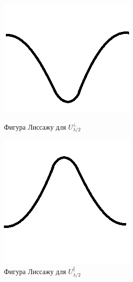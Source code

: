 \documentclass[a4paper, 12pt]{article}%
\begin{document}
\begin{enumerate}
	\begin{figure}[H]
		\centering
		\begin{minipage}[b]{0.3\linewidth}
			\includegraphics[width=\textwidth]{perp1-2.png}
			\caption{Фигура Лиссажу для $U_{\lambda/2}^{\perp}$}
		\end{minipage}
		\hfill
		\begin{minipage}[b]{0.3\linewidth}
			\includegraphics[width=\textwidth]{parall1-2.png}
			\caption{Фигура Лиссажу для $U_{\lambda/2}^{\parallel}$}
		\end{minipage}
	\end{figure}
	

\end{enumerate}
\end{document}

